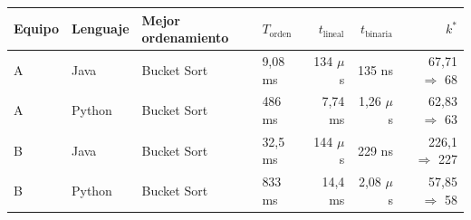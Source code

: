 {\footnotesize
\begin{tabular}{llllrrr}
\toprule
Equipo & Lenguaje & Mejor ordenamiento & $T_{\text{orden}}$ & $t_{\text{lineal}}$ & $t_{\text{binaria}}$ & $k^*$ \\
\midrule
A & Java & Bucket Sort & 9,08 ms & 134 $\mu$s & 135 ns & 67,71 $\Rightarrow$ 68 \\
A & Python & Bucket Sort & 486 ms & 7,74 ms & 1,26 $\mu$s & 62,83 $\Rightarrow$ 63 \\
B & Java & Bucket Sort & 32,5 ms & 144 $\mu$s & 229 ns & 226,1 $\Rightarrow$ 227 \\
B & Python & Bucket Sort & 833 ms & 14,4 ms & 2,08 $\mu$s & 57,85 $\Rightarrow$ 58 \\
\bottomrule
\end{tabular}}\par
